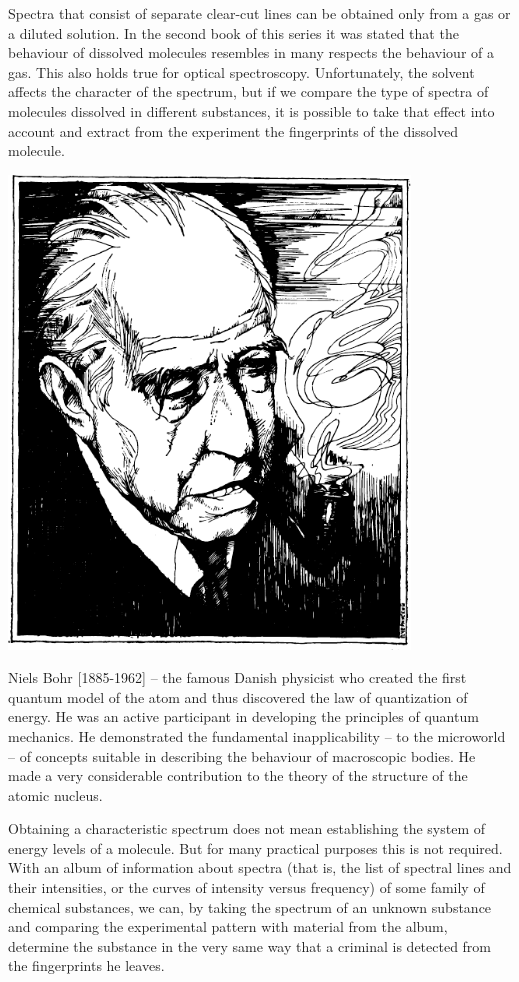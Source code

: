Spectra that consist of separate clear-cut lines can be obtained only from a gas or a diluted solution. In the second book of this series it was stated that the behaviour of dissolved molecules resembles in many respects the behaviour of a gas. This also holds true for optical spectroscopy. Unfortunately, the solvent affects the character of the spectrum, but if we compare the type of spectra of molecules dissolved in different substances, it is possible to take that effect into account and extract from the experiment the fingerprints of the dissolved molecule.
\begin{center}
\includegraphics[width=0.8\textwidth]{figures/bohr.pdf}
\end{center}
{\small \textsf{{Niels Bohr [1885-1962]}} -- \textsf{\footnotesize the famous Danish physicist who creat­ed the first quantum model of the atom and thus discovered the law of quantization of energy. He was an active participant in developing the principles of quantum mechanics. He demonstrated the fundamental inapplicability -- to the microworld -- of concepts suitable in describing the behaviour of macroscopic bodies. He made a very considerable contribution to the theory of the structure of the atomic nucleus.}}

Obtaining a characteristic spectrum does not mean establishing the system of energy levels of a molecule. But for many practical purposes this is not required. With an album of information about spectra (that is, the list of spectral lines and their intensities, or the curves of intensity versus frequency) of some family of chemical substances, we can, by taking the spectrum of an unknown substance and comparing the experimental pattern with material from the album, determine the substance in the very same way that a criminal is detected from the fingerprints he leaves.


